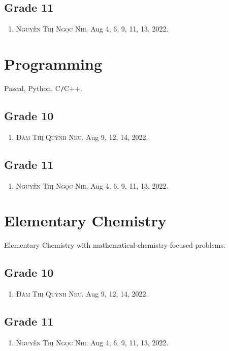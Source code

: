\documentclass{article}
\numberwithin{equation}{section}
\begin{document}
\subsection{Grade 11}
\begin{enumerate}
	\item \textsc{Nguyễn Thị Ngọc Nhi.} Aug 4, 6, 9, 11, 13, 2022.
\end{enumerate}

\section{Programming}
Pascal, Python, C\texttt{/}C++.

\subsection{Grade 10}
\begin{enumerate}
	\item \textsc{Đàm Thị Quỳnh Như.} Aug 9, 12, 14, 2022.
\end{enumerate}

\subsection{Grade 11}
\begin{enumerate}
	\item \textsc{Nguyễn Thị Ngọc Nhi.} Aug 4, 6, 9, 11, 13, 2022.
\end{enumerate}

\section{Elementary Chemistry}
Elementary Chemistry with mathematical-chemistry-focused problems.

\subsection{Grade 10}
\begin{enumerate}
	\item \textsc{Đàm Thị Quỳnh Như.} Aug 9, 12, 14, 2022.
\end{enumerate}

\subsection{Grade 11}
\begin{enumerate}
	\item \textsc{Nguyễn Thị Ngọc Nhi.} Aug 4, 6, 9, 11, 13, 2022.
\end{enumerate}


\printbibliography[heading=bibintoc]
	
\end{document}
